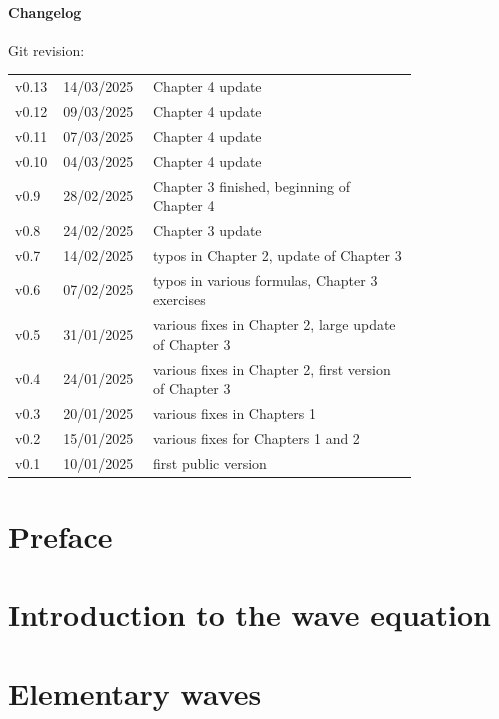 \documentclass[a4paper,12pt]{book}
\theoremstyle{plain}
\theoremstyle{plain}
\theoremstyle{plain}
\theoremstyle{plain}
\theoremstyle{definition}
\theoremstyle{definition}
\begin{document}
{  \subsubsection*{Changelog}
  \scriptsize
  Git revision: \gitDescribe\vspace*{0.2cm}\\
  \begin{tabular}{@{} L{0.05\linewidth} L{0.15\linewidth} L{0.6\linewidth} @{}}
    \toprule
    v0.13 & 14/03/2025 & Chapter 4 update\\
    v0.12 & 09/03/2025 & Chapter 4 update\\
    v0.11 & 07/03/2025 & Chapter 4 update\\
    v0.10 & 04/03/2025 & Chapter 4 update\\
    v0.9 & 28/02/2025 & Chapter 3 finished, beginning of Chapter 4\\
    v0.8 & 24/02/2025 & Chapter 3 update \\
    v0.7 & 14/02/2025 & typos in Chapter 2, update of Chapter 3\\
    v0.6 & 07/02/2025 & typos in various formulas, Chapter 3 exercises \\
    v0.5 & 31/01/2025 & various fixes in Chapter 2, large update of Chapter 3\\
    v0.4 & 24/01/2025 & various fixes in Chapter 2, first version of Chapter 3\\
    v0.3 & 20/01/2025 & various fixes in Chapters 1\\
    v0.2 & 15/01/2025 & various fixes for Chapters 1 and 2\\
    v0.1 & 10/01/2025 & first public version\\
    \bottomrule
  \end{tabular}
}

\tableofcontents
\glsaddallunused
\printglossary[title=Symbols and Notation]
\chapter*{Preface}

\mainmatter
\pagestyle{fancy}
\chapter{Introduction to the wave equation}
\label{chap:wave-eq}

\vfill\pagebreak

\shipoutAnswer
\chapter{Elementary waves}
\label{chap:elementary-waves}

\vfill\pagebreak

\shipoutAnswer
\end{document}
